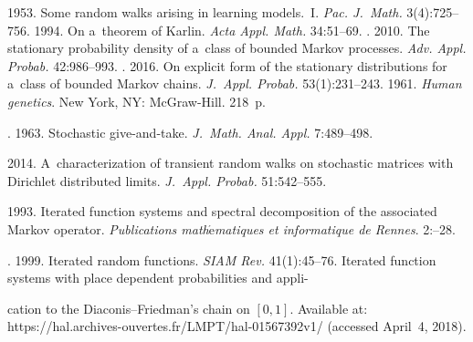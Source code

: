   \begin{multicols}{2}

\renewcommand{\bibname}{\protect\rmfamily References}

{\small\frenchspacing
 {%
 \begin{thebibliography}{99}
   1953. Some random walks arising in learning models.~I.
  \textit{Pac. J.~Math.} 3(4):725--756.
   1994. On a~theorem of Karlin. \textit{Acta Appl. Math.} 34:51--69.
  . 2010. The stationary probability density of a~class of 
bounded Markov processes. \textit{Adv. Appl. Probab.} 42:986--993.
  . 2016. On explicit form of the stationary distributions 
for a~class of bounded Markov chains. \textit{J.~Appl. Probab.} 53(1):231--243. 
   1961. \textit{Human genetics}. New York, NY: McGraw-Hill. 218~p.
  
  . 1963. Stochastic give-and-take. \textit{J.~Math. 
Anal. Appl.} 7:489--498.

   2014. A~characterization of transient random walks on stochastic 
matrices with Dirichlet distributed limits. \textit{J.~Appl. Probab.} 51:542--555.

   1993. Iterated function systems and spectral 
decomposition of the associated Markov operator. \textit{Publications 
math$\acute{\mbox{e}}$matiques et informatique de Rennes}. 2:--28.



  . 1999. Iterated random functions. \textit{SIAM 
Rev.} 41(1):45--76.
   Iterated function systems with place 
dependent probabilities and appli-\linebreak\vspace*{-12pt}

\pagebreak

\noindent
cation to the Diaconis--Friedman's chain on $[0,1]$. Available 
at: {\sf https://hal.archives-ouvertes.fr/LMPT/hal-01567392v1/} (accessed April~4, 2018).
  

\end{thebibliography}}}
\end{multicols}
